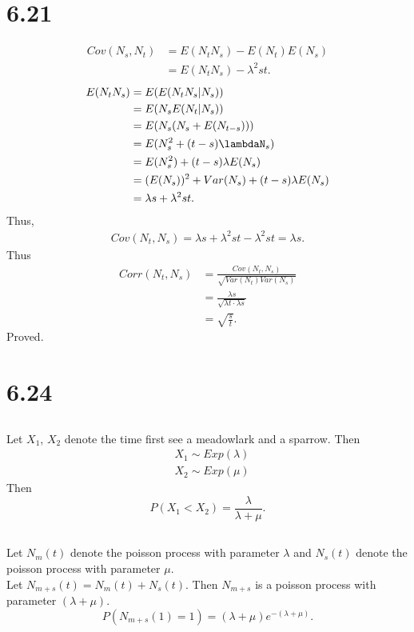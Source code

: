 \documentclass{article}
\begin{document}
\section{6.21}
\begin{align*}
    Cov(N_s, N_t)&=E(N_tN_s)-E(N_t)E(N_s) \\
    &= E(N_tN_s) - \lambda^2st.
\end{align*}
\begin{align*}
    E(N_tN_s)&=E(E(N_tN_s|N_s)) \\
    &= E(N_sE(N_t|N_s)) \\
    &= E(N_s(N_s+E(N_{t-s}))) \\
    &= E(N_s^2+(t-s)\lambdaN_s) \\
    &= E(N_s^2) + (t-s)\lambda E(N_s) \\
    &= (E(N_s))^2 + Var(N_s) + (t-s)\lambda E(N_s) \\
    &= \lambda s + \lambda^2 st.
\end{align*}
Thus,
\begin{align*}
    Cov(N_t, N_s)=\lambda s + \lambda^2 st-\lambda^2 st = \lambda s.
\end{align*}
Thus
\begin{align*}
    Corr(N_t, N_s) &= \frac{Cov(N_t, N_s)}{\sqrt{Var(N_t)Var(N_s)}} \\
    &= \frac{\lambda s}{\sqrt{\lambda t \cdot \lambda s}} \\
    &= \sqrt{\frac{s}{t}}.
\end{align*}
Proved. 

\section{6.24}
\subsection{}
Let $X_1$, $X_2$ denote the time first see a meadowlark and a sparrow. Then
\begin{align*}
    &X_1 \sim Exp(\lambda) \\
    &X_2 \sim Exp(\mu)
\end{align*}
Then
\begin{equation*}
    P(X_1 < X_2) =\frac{\lambda}{\lambda+\mu}.
\end{equation*}
\subsection{}
Let $N_m(t)$ denote the poisson process with parameter $\lambda$ and $N_s(t)$ denote the poisson process with parameter $\mu$. \\
Let $N_{m+s}(t)=N_m(t)+N_s(t)$. Then $N_{m+s}$ is a poisson process with parameter $(\lambda+\mu)$.
\begin{equation*}
    P(N_{m+s}(1)=1)=(\lambda+\mu)e^{-(\lambda+\mu)}.
\end{equation*}
\end{document}
